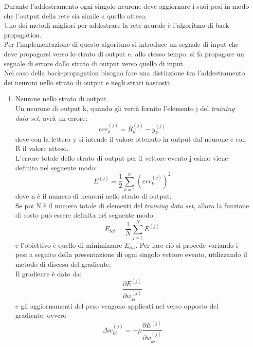 Durante l'addestramento ogni singolo neurone deve aggiornare i suoi pesi in modo che l'output della rete sia simile a quello atteso. \\
Uno dei metodi migliori per addestrare la rete neurale è l'algoritmo di back-propagation. \\
Per l'implementazione di questo algoritmo si introduce un segnale di input che deve propagarsi verso lo strato di output e, allo stesso tempo, si fa propagare un segnale di errore dallo strato di output verso quello di input.\\
Nel caso della back-propagation bisogna fare una distinzione tra l'addestramento dei neuroni nello strato di output e negli strati nascosti:
\begin{enumerate}
	\item Neurone nello strato di output.\\
	Un neurone di output k, quando gli verrà fornito l'elemento j del \textit{training data set}, avrà un errore:
	\begin{equation}
	err_k^{(j)} = R_k^{(j)} - y_k^{(j)}
	\end{equation}
	dove con la lettera y si intende il valore ottenuto in output dal neurone e con R il valore atteso. \\
	L'errore totale dello strato di output per il vettore evento j-esimo viene definito nel seguente modo:
	\begin{equation}
	E^{(j)} = \frac{1}{2} \sum_{k=1}^{n} (err_k^{(j)})^2
	\end{equation}
	dove n è il numero di neuroni nello strato di output. \\
	Se poi N è il numero totale di elementi del \textit{training data set}, allora la funzione di costo può essere definita nel seguente modo:
	\begin{equation}
	E_{tot} = \frac{1}{N}\sum_{j=1}^{N} E^{(j)}
	\end{equation}
	e l'obiettivo è quello di minimizzare $E_{tot}$. Per fare ciò si procede variando i pesi a seguito della presentazione di ogni singolo vettore evento, utilizzando il metodo di discesa del gradiente.\\ 
	Il gradiente è dato da:
	\begin{equation}
	\frac{\partial E^{(j)} }{\partial w_{ki}^{(j)}}
	\end{equation}
	e gli aggiornamenti del peso vengono applicati nel verso opposto del gradiente, ovvero
	\begin{equation}
	\Delta w_{ki}^{(j)} = -\mu \frac{\partial E^{(j)} }{\partial w_{ki}^{(j)}}

\end{equation}
\end{enumerate}
